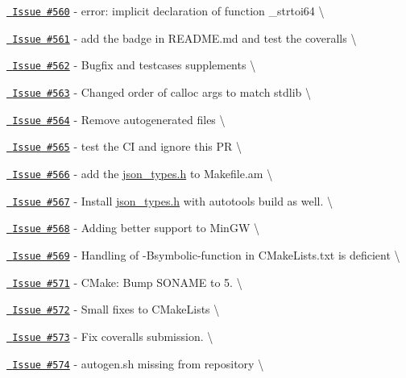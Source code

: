 \begin{DoxyItemize}
\item \href{https://github.com/json-c/json-c/issues/560}{\texttt{ Issue \#560}} -\/ error\+: implicit declaration of function \textquotesingle{}\+\_\+strtoi64\textquotesingle{} \textbackslash{}
\item \href{https://github.com/json-c/json-c/issues/561}{\texttt{ Issue \#561}} -\/ add the badge in README.\+md and test the coveralls \textbackslash{}
\item \href{https://github.com/json-c/json-c/issues/562}{\texttt{ Issue \#562}} -\/ Bugfix and testcases supplements \textbackslash{}
\item \href{https://github.com/json-c/json-c/issues/563}{\texttt{ Issue \#563}} -\/ Changed order of calloc args to match stdlib \textbackslash{}
\item \href{https://github.com/json-c/json-c/issues/564}{\texttt{ Issue \#564}} -\/ Remove autogenerated files \textbackslash{}
\item \href{https://github.com/json-c/json-c/issues/565}{\texttt{ Issue \#565}} -\/ test the CI and ignore this PR \textbackslash{}
\item \href{https://github.com/json-c/json-c/issues/566}{\texttt{ Issue \#566}} -\/ add the \mbox{\hyperlink{json__types_8h}{json\+\_\+types.\+h}} to Makefile.\+am \textbackslash{}
\item \href{https://github.com/json-c/json-c/issues/567}{\texttt{ Issue \#567}} -\/ Install \mbox{\hyperlink{json__types_8h}{json\+\_\+types.\+h}} with autotools build as well. \textbackslash{}
\item \href{https://github.com/json-c/json-c/issues/568}{\texttt{ Issue \#568}} -\/ Adding better support to Min\+GW \textbackslash{}
\item \href{https://github.com/json-c/json-c/issues/569}{\texttt{ Issue \#569}} -\/ Handling of -\/Bsymbolic-\/function in CMake\+Lists.\+txt is deficient \textbackslash{}
\item \href{https://github.com/json-c/json-c/issues/571}{\texttt{ Issue \#571}} -\/ CMake\+: Bump SONAME to 5. \textbackslash{}
\item \href{https://github.com/json-c/json-c/issues/572}{\texttt{ Issue \#572}} -\/ Small fixes to CMake\+Lists \textbackslash{}
\item \href{https://github.com/json-c/json-c/issues/573}{\texttt{ Issue \#573}} -\/ Fix coveralls submission. \textbackslash{}
\item \href{https://github.com/json-c/json-c/issues/574}{\texttt{ Issue \#574}} -\/ autogen.\+sh missing from repository \textbackslash{}

\end{DoxyItemize}
